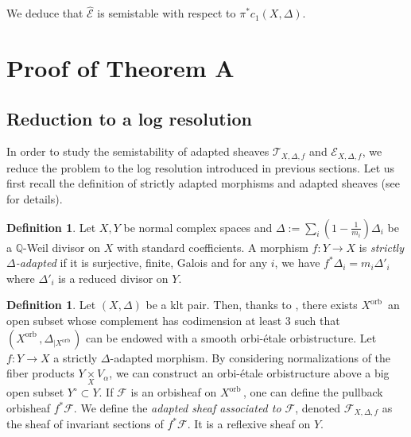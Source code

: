 \documentclass[12pt,a4paper]{amsart}
\newcommand{\Q}{\mathbb{Q}}
\newcommand{\orb}{\mathrm{orb}\,}
\theoremstyle{plain}
\theoremstyle{definition}
\newtheorem{defi}[theo]{Definition}
\begin{document}
We deduce that $\widehat{\mathcal{E}}$ is semistable with respect to $\pi^*c_1(X, \Delta)$.


\section{Proof of Theorem A}

\subsection{Reduction to a log resolution}

In order to study the semistability of adapted sheaves $\mathcal{T}_{X, \Delta, f}$ and $\mathcal{E}_{X, \Delta, f}$, we reduce the problem to the log resolution introduced in previous sections. Let us first recall the definition of strictly adapted morphisms and adapted sheaves (see \cite[Sect.~2.1.1 and Sect.~3.2.1]{Dai25} for details).

\begin{defi}
    Let $X, Y$ be normal complex spaces and $\Delta := \sum_i \left( 1 - \frac{1}{m_i} \right) \Delta_i $ be a $\Q$-Weil divisor on $X$ with standard coefficients. A morphism $f : Y \to X$ is \emph{strictly $\Delta$-adapted} if it is surjective, finite, Galois and for any $i$, we have $f^*\Delta_i = m_i \Delta'_i$ where $\Delta'_i$ is a reduced divisor on $Y$.
\end{defi}

\begin{defi}
    Let $(X, \Delta)$ be a klt pair. Then, thanks to \cite[Lemma.~14]{CGG24}, there exists $X^\orb$ an open subset whose complement has codimension at least 3 such that $(X^\orb, \Delta_{|X^\orb})$ can be endowed with a smooth orbi-\'etale orbistructure. Let $f : Y \to X$ a strictly $\Delta$-adapted morphism. By considering normalizations of the fiber products $Y \underset{X}{\times} V_\alpha$, we can construct an orbi-\'etale orbistructure above a big open subset $Y^\circ \subset Y$. If $\mathcal{F}$ is an orbisheaf on $X^\orb$, one can define the pullback orbisheaf $f^* \mathcal{F}$. We define the \emph{adapted sheaf associated to $\mathcal{F}$}, denoted $\mathcal{F}_{X, \Delta, f}$ as the sheaf of invariant sections of $f^*\mathcal{F}$. It is a reflexive sheaf on $Y$.\\
\end{defi}
\end{document}
